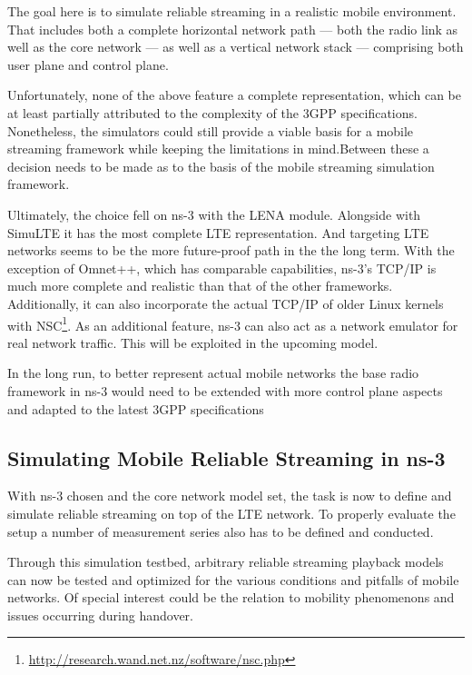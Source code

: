 The goal here is to simulate reliable streaming in a realistic mobile environment. That includes both a complete horizontal network path --- both the radio link as well as the core network --- as well as a vertical network stack --- comprising both user plane and control plane.

Unfortunately, none of the above feature a complete representation, which can be at least partially attributed to the complexity of the \gls{3GPP} specifications. Nonetheless, the simulators could still provide a viable basis for a mobile streaming framework while keeping the limitations in mind.Between these a decision needs to be made as to the basis of the mobile streaming simulation framework. 

Ultimately, the choice fell on ns-3 with the LENA module. Alongside with SimuLTE it has the most complete \gls{LTE} representation. And targeting \gls{LTE} networks seems to be the more future-proof path in the the long term. With the exception of Omnet++, which has comparable capabilities, ns-3's \gls{TCP}/\gls{IP} is much more complete and realistic than that of the other frameworks. Additionally, it can also incorporate the actual \gls{TCP}/\gls{IP} of older Linux kernels with NSC\footnote{\url{http://research.wand.net.nz/software/nsc.php}}. As an additional feature, ns-3 can also act as a network emulator for real network traffic. This will be exploited in the upcoming model.

In the long run, to better represent actual mobile networks the base radio framework in ns-3 would need to be extended with more control plane aspects and adapted to the latest \gls{3GPP} specifications


\subsection{Simulating Mobile Reliable Streaming in ns-3}

With ns-3 chosen and the core network model set, the task is now to define and simulate reliable streaming on top of the \gls{LTE} network. To properly evaluate the setup a number of measurement series also has to be defined and conducted.

Through this simulation testbed, arbitrary reliable streaming playback models can now be tested and optimized for the various conditions and pitfalls of mobile networks. Of special interest could be the relation to mobility phenomenons and issues occurring during handover.

